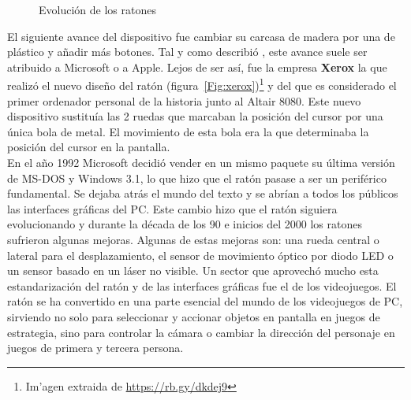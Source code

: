 \begin{figure}[t]
     \hfill
{}
     \caption{Evoluci\'on de los ratones}
     \label{fig:primera}
   \end{figure}


El siguiente avance del dispositivo fue cambiar su carcasa de madera por una de pl\'astico y a\~nadir m\'as botones. Tal y como describi\'o \cite{xerox}, este avance suele ser atribuido a Microsoft o a Apple. Lejos de ser as\'i, fue la empresa \textbf{Xerox} la que realiz\'o el nuevo dise\~no del rat\'on (figura~\ref{Fig:xerox})\footnote{Im'agen extraida de \url{https://rb.gy/dkdej9}} y del que es considerado el primer ordenador personal de la historia junto al Altair 8080. Este nuevo dispositivo sustitu\'ia las 2 ruedas que marcaban la posici\'on del cursor por una \'unica bola de metal. El movimiento de esta bola era la que determinaba la posici\'on del cursor en la pantalla. \\

En el a\~no 1992 Microsoft decidi\'o vender en un mismo paquete su \'ultima versi\'on de MS-DOS y Windows 3.1, lo que hizo que el rat\'on pasase a ser un perif\'erico fundamental. Se dejaba atr\'as el mundo del texto y se abr\'ian a todos los p\'ublicos las interfaces gr\'aficas del PC. Este cambio hizo que el rat\'on siguiera evolucionando y durante la d\'ecada de los 90 e inicios del 2000 los ratones sufrieron algunas mejoras. Algunas de estas mejoras son: una rueda central o lateral para el desplazamiento, el sensor de movimiento \'optico por diodo LED o un sensor basado en un l\'aser no visible. Un sector que aprovech\'o mucho esta estandarizaci\'on del rat\'on y de las interfaces gr\'aficas fue el de los videojuegos. El rat\'on se ha convertido en una parte esencial del mundo de los videojuegos de PC, sirviendo no solo para seleccionar y accionar objetos en pantalla en juegos de estrategia, sino para controlar la c\'amara o cambiar la direcci\'on del personaje en juegos de primera y tercera persona.\\


